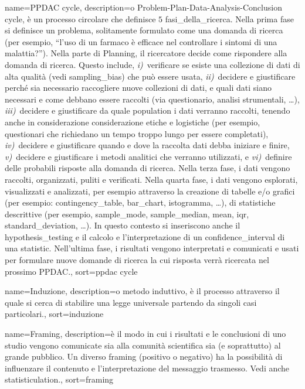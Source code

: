 {
	 name={PPDAC cycle},
	 description={o Problem-Plan-Data-Analysis-Conclusion cycle, \`e un processo circolare che definisce $5$ \gls{fasi_della_ricerca}. Nella prima fase si definisce un problema, solitamente formulato come una domanda di ricerca (per esempio, ``l'uso di un farmaco \`e efficace nel controllare i sintomi di una malattia?''). Nella parte di Planning, il ricercatore decide come rispondere alla domanda di ricerca. Questo include, \emph{i)}~verificare se esiste una collezione di dati di alta qualit\`a (vedi \gls{sampling_bias}) che pu\`o essere usata, \emph{ii)}~decidere e giustificare perch\'e sia necessario raccogliere nuove collezioni di dati, e quali dati siano necessari e come debbano essere raccolti (via questionario, analisi strumentali, \dots), \emph{iii)}~decidere e giustificare da quale \gls{population} i dati verranno raccolti, tenendo anche in considerazione considerazione etiche e logistiche (per esempio, questionari che richiedano un tempo troppo lungo per essere completati), \emph{iv)}~decidere e giustificare quando e dove la raccolta dati debba iniziare e finire, \emph{v)}~decidere e giustificare i metodi analitici che verranno utilizzati, e \emph{vi)}~definire delle probabili risposte alla domanda di ricerca. Nella terza fase, i dati vengono raccolti, organizzati, puliti e verificati. Nella quarta fase, i dati vengono esplorati, visualizzati e analizzati, per esempio attraverso la creazione di tabelle e/o grafici (per esempio: \gls{contingency_table}, \gls{bar_chart}, \gls{istogramma}, \dots), di statistiche descrittive (per esempio, \gls{sample_mode}, \gls{sample_median}, \gls{mean}, \gls{iqr}, \gls{standard_deviation}, \dots). In questo contesto si inseriscono anche il \gls{hypothesis_testing} e il calcolo e l'interpretazione di un \gls{confidence_interval} di una \gls{statistic}. Nell'ultima fase, i risultati vengono interpretati e comunicati e usati per formulare nuove domande di ricerca la cui risposta verr\`a ricercata nel prossimo \gls{PPDAC}.},
	 sort={ppdac cycle}
}

{
	 name={Induzione},
	 description={o metodo induttivo, \`e il processo attraverso il quale si cerca di stabilire una legge universale partendo da singoli casi particolari.},
	 sort={induzione}
}

{
	 name={Framing},
	 description={\`e il modo in cui i risultati e le conclusioni di uno studio vengono comunicate sia alla comunit\`a scientifica sia (e soprattutto) al grande pubblico. Un diverso framing (positivo o negativo) ha la possibilit\`a di influenzare il contenuto e l'interpretazione del messaggio trasmesso. Vedi anche \gls{statisticulation}.},
	 sort={framing}
}

